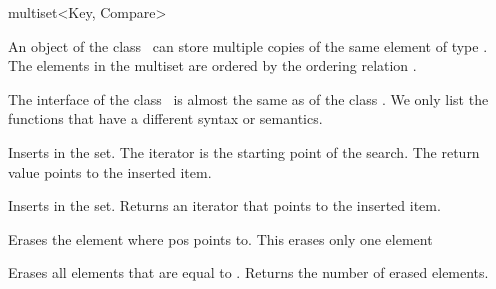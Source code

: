 
\ccHtmlNoClassLinks
\begin{ccClassTemplate} {multiset<Key, Compare>}


\ccDefinition
An object of the class \ccClassTemplateName\ can store multiple copies
of the same element of type .  The elements in the
multiset are ordered by the ordering relation .

The interface of the class \ccClassTemplateName\ is almost the same as of
the class . We only list the functions 
that have a different syntax or semantics.



\ccTypes
{}



\ccOperations
{}
{Inserts  in the set. The iterator  is the starting 
 point of  the search.  The return value points to the inserted item.}

{Inserts  in the set. Returns an iterator that points to the 
 inserted item.}

{Erases the element where pos points to. This erases only one element}

{Erases all  elements that are equal to . Returns the number
 of erased elements.}

\end{ccClassTemplate} 
